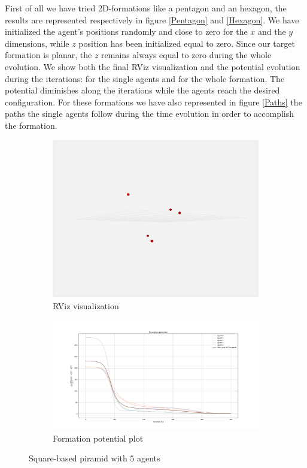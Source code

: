 \documentclass[a4paper,11pt,oneside]{book}
\begin{document}
First of all we have tried 2D-formations like a pentagon and an hexagon, the results are represented respectively in figure \ref{Pentagon} and \ref{Hexagon}. We have initialized the agent's positions randomly and close to zero for the $x$ and the $y$ dimensions, while $z$ position has been initialized equal to zero. Since our target formation is planar, the $z$ remains always equal to zero during the whole evolution.
We show both the final RViz visualization and the potential evolution during the iterations: for the single agents and for the whole formation. The potential diminishes along the iterations while the agents reach the desired configuration. 
For these formations we have also represented in figure \ref{Paths} the paths the single agents follow during the time evolution in order to accomplish the formation.

\begin{figure}
\centering
	\begin{subfigure}{0.49\textwidth}	
	\includegraphics[scale=0.24]{Task-2.2_R-viz_No-Coll-Avoid_Piramid}
	\caption{RViz visualization}
	\end{subfigure}
\hfill
	\begin{subfigure}{0.49\textwidth}	
	\includegraphics[scale=0.42]{Task-2.2_Formation-p_No-Coll-Avoid_Piramid}
	\caption{Formation potential plot}
	\end{subfigure}
\caption{Square-based piramid with $5$ agents}
\label{Piramid}
\end{figure}
\end{document}
